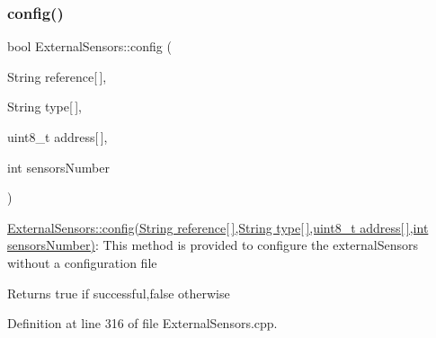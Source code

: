 \subsubsection{\texorpdfstring{config()}{config()}\hspace{0.1cm}{\footnotesize\ttfamily [2/2]}}
{\footnotesize\ttfamily bool External\+Sensors\+::config (\begin{DoxyParamCaption}\item[{String}]{reference\mbox{[}$\,$\mbox{]},  }\item[{String}]{type\mbox{[}$\,$\mbox{]},  }\item[{uint8\+\_\+t}]{address\mbox{[}$\,$\mbox{]},  }\item[{int}]{sensors\+Number }\end{DoxyParamCaption})}

\hyperlink{class_external_sensors_ac829858f587e15a3fcb00567248f0edd}{External\+Sensors\+::config(\+String reference\mbox{[}$\,$\mbox{]},\+String type\mbox{[}$\,$\mbox{]},uint8\+\_\+t address\mbox{[}$\,$\mbox{]},int sensors\+Number)}\+: This method is provided to configure the external\+Sensors without a configuration file

\begin{DoxyReturn}{Returns}
true if successful,false otherwise 
\end{DoxyReturn}


Definition at line 316 of file External\+Sensors.\+cpp.


